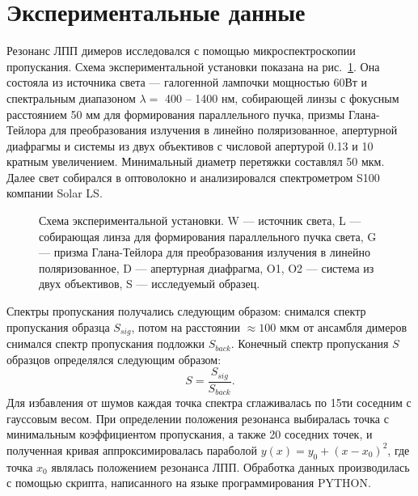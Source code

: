 \section{Экспериментальные данные}

Резонанс ЛПП димеров исследовался с помощью микроспектроскопии пропускания. Схема экспериментальной установки показана на рис.~\ref{img:expsetup}. Она состояла из источника света --- галогенной лампочки мощностью 60Вт и спектральным диапазоном $ \lambda =  $ 400 -- 1400 нм, собирающей линзы с фокусным расстоянием 50 мм для формирования параллельного пучка, призмы Глана-Тейлора для преобразования излучения в линейно поляризованное, апертурной диафрагмы и системы из двух объективов с числовой апертурой 0.13 и 10 кратным увеличением. Минимальный диаметр перетяжки составлял 50 мкм. Далее свет собирался в оптоволокно и анализировался спектрометром S100 компании Solar LS.
\begin{figure}
\caption{Схема экспериментальной установки. W --- источник света, L --- собирающая линза для формирования параллельного пучка света, G --- призма Глана-Тейлора для преобразования излучения в линейно поляризованное, D --- апертурная диафрагма, O1, O2 --- система из двух объективов, S --- исследуемый образец. }
\label{img:expsetup}
\end{figure}
Спектры пропускания получались следующим образом: снимался спектр пропускания образца $ S_{sig} $, потом на расстоянии $ \approx 100 $ мкм от ансамбля димеров снимался спектр пропускания подложки $ S_{back} $. Конечный спектр пропускания $ S $ образцов определялся следующим образом:
\begin{equation}
S = \frac{S_{sig}}{S_{back}}.
\end{equation}
Для избавления от шумов каждая точка спектра сглаживалась по 15ти соседним с гауссовым весом. При определении положения резонанса выбиралась точка с минимальным коэффициентом пропускания, а также 20 соседних точек, и полученная кривая аппроксимировалась параболой $ y(x) = y_0 + (x - x_0)^2 $, где точка $ x_0 $ являлась положением резонанса ЛПП. Обработка данных производилась с помощью скрипта, написанного на языке программирования PYTHON.

